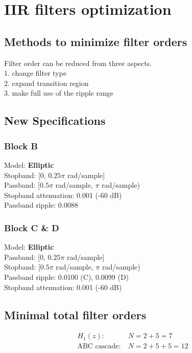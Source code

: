 \documentclass{article}
\newenvironment{homeworkProblem}[1]{
	\section{#1}
	}{
}
\newenvironment{homeworkSection}[1]{
	\subsection{#1}
	}{
}
\begin{document}

\begin{homeworkProblem}{IIR filters optimization}


\begin{homeworkSection}{Methods to minimize filter orders}
Filter order can be reduced from three aspects.\\
1. change filter type\\
2. expand transition region\\
3. make full use of the ripple range
\end{homeworkSection}


\begin{homeworkSection}{New Specifications}
\subsubsection{Block B}
Model: \textbf{Elliptic}\\
Stopband: [0, $0.25\pi$ rad/sample]\\
Passband: [$0.5\pi$ rad/sample, $\pi$ rad/sample)\\
Stopband attenuation: 0.001 (-60 dB)\\
Passband ripple: 0.0088

\subsubsection{Block C \& D}
Model: \textbf{Elliptic}\\
Passband: [0, $0.25\pi$ rad/sample]\\
Stopband: [$0.5\pi$ rad/sample, $\pi$ rad/sample)\\
Passband ripple: 0.0100 (C), 0.0099 (D)\\
Stopband attenuation: 0.001 (-60 dB)
\end{homeworkSection}


\begin{homeworkSection}{Minimal total filter orders}
\begin{align*}
H_1(z):\ &N = 2 + 5 = 7\\
\text{ABC cascade}:\ &N = 2 + 5 + 5 = 12
\end{align*}
\end{homeworkSection}


\end{homeworkProblem}
\end{document}
